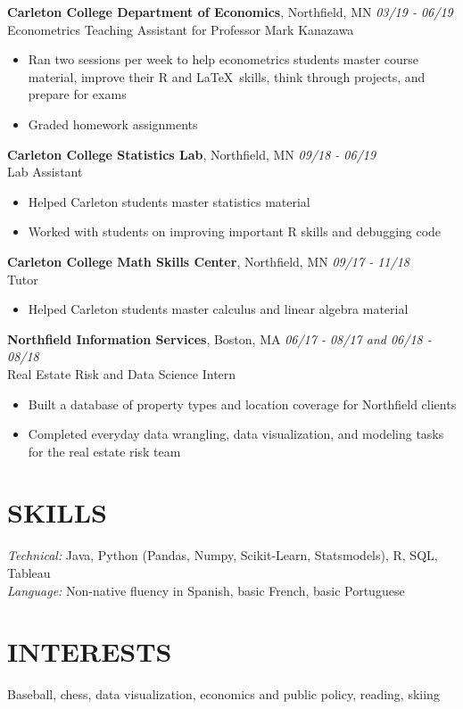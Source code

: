 \documentclass[margin, 10pt]{res} %
\begin{document}
\begin{resume}
{\sl} \textbf{Carleton College Department of Economics}, Northfield, MN \hfill \textit{03/19 - 06/19}\\
{\sl} Econometrics Teaching Assistant for Professor Mark Kanazawa\smallskip
{\sl} \begin{itemize}
	\item Ran two sessions per week to help econometrics students master course material, improve their R and \LaTeX \ skills, think through projects, and prepare for exams
	\item Graded homework assignments
\end{itemize}


{\sl} \textbf{Carleton College Statistics Lab}, Northfield, MN \hfill \textit{09/18 - 06/19}\\
{\sl} Lab Assistant \smallskip
{\sl} \begin{itemize}
\item Helped Carleton students master statistics material
\item Worked with students on improving important R skills and debugging code
\end{itemize}

{\sl} \textbf{Carleton College Math Skills Center}, Northfield, MN \hfill \textit{09/17 - 11/18}\\
{\sl} Tutor \smallskip
{\sl} \begin{itemize}
\item Helped Carleton students master calculus and linear algebra material
\end{itemize}

{\sl} \textbf{Northfield Information Services}, Boston, MA \hfill \textit{06/17 - 08/17 and 06/18 - 08/18}\\
{\sl} Real Estate Risk and Data Science Intern \smallskip
{\sl} \begin{itemize}
\item Built a database of property types and location coverage for Northfield clients
\item Completed everyday data wrangling, data visualization, and modeling tasks for the real estate risk team
\end{itemize}


\section{SKILLS}
{\sl Technical:} Java, Python (Pandas, Numpy, Scikit-Learn, Statsmodels), R, SQL, Tableau\\ \smallskip
{\sl Language:} Non-native fluency in Spanish, basic French, basic Portuguese

\section{INTERESTS}
{\sl} Baseball, chess, data visualization, economics and public policy, reading, skiing

\end{resume}
\end{document}
